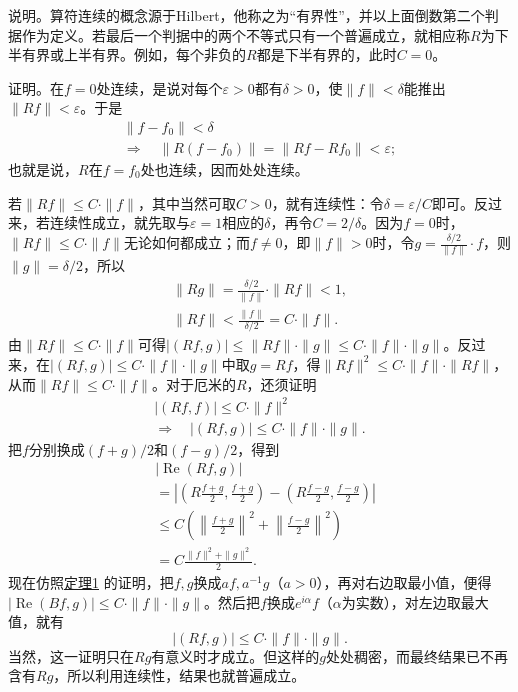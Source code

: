 \documentclass[fontsize=13pt,twoside,openany,headings=normal,parskip=false,bookmarkpackage=false,DIV=calc]{scrbook}
\newcommand{\textkaishu}[1]{{\zhkaishu #1}}
\begin{document}
\hypertarget{origpage-52}{}\label{origpage-52}\textkaishu{说明。}算符连续的概念源于Hilbert，他称之为“有界性”，并以上面倒数第二个判据作为定义。若最后一个判据中的两个不等式只有一个普遍成立，就相应称$R$为下半有界或上半有界。例如，每个非负的$R$都是下半有界的，此时$C=0$。

\textkaishu{证明。}在$f=0$处连续，是说对每个$\varepsilon>0$都有$\delta>0$，使$\|f\|<\delta$能推出$\|Rf\|<\varepsilon$。于是
\begin{gather*}
\|f-f_0\|<\delta\\
\Longrightarrow\quad\|R(f-f_0)\|=\|Rf-Rf_0\|<\varepsilon;
\end{gather*}
也就是说，$R$在$f=f_0$处也连续，因而处处连续。

若$\|Rf\|\leq C\cdot\|f\|$，其中当然可取$C>0$，就有连续性：令$\delta=\varepsilon/C$即可。反过来，若连续性成立，就先取与$\varepsilon=1$相应的$\delta$，再令$C=2/\delta$。因为$f=0$时，$\|Rf\|\leq C\cdot\|f\|$无论如何都成立；而$f\ne0$，即$\|f\|>0$时，令$g=\frac{\delta/2}{\|f\|}\cdot f$，则$\|g\|=\delta/2$，所以
\begin{gather*}
\|Rg\|=\frac{\delta/2}{\|f\|}\cdot\|Rf\|<1,\\
\|Rf\|<\frac{\|f\|}{\delta/2}=C\cdot\|f\|.
\end{gather*}
由$\|Rf\|\leq C\cdot\|f\|$可得$|(Rf,\allowbreak g)|\leq\|Rf\|\cdot\|g\|\leq C\cdot\|f\|\cdot\|g\|$。反过来，在$|(Rf,\allowbreak g)|\leq C\cdot\|f\|\cdot\|g\|$中取$g=Rf$，得$\|Rf\|^2\leq C\cdot\|f\|\cdot\|Rf\|$，从而$\|Rf\|\leq C\cdot\|f\|$。对于厄米的$R$，还须证明
\begin{gather*}
|(Rf,f)|\leq C\cdot\|f\|^2\\
\Longrightarrow\quad |(Rf,g)|\leq C\cdot\|f\|\cdot\|g\|.
\end{gather*}
把$f$分别换成$(f+g)/2$和$(f-g)/2$，得到
\begin{align*}
&|\operatorname{Re}(Rf,g)|\\
&=\left|\left(R\frac{f+g}{2},\frac{f+g}{2}\right)-\left(R\frac{f-g}{2},\frac{f-g}{2}\right)\right|\\
&\leq C\left(\left\|\frac{f+g}{2}\right\|^2+\left\|\frac{f-g}{2}\right\|^2\right)\\
&=C\frac{\|f\|^2+\|g\|^2}{2}.
\end{align*}
现在仿照\CJKglue \hyperref[thm:II.1]{定理1} 的证明，把$f,\allowbreak g$换成$af,\allowbreak a^{-1}g$（$a>0$），再对右边取最小值，便得$|\operatorname{Re}(Bf,\allowbreak g)|\leq C\cdot\|f\|\cdot\|g\|$。然后把$f$换成$e^{i\alpha}f$（$\alpha$为实数），对左边取最大值，就有
\[
|(Rf,g)|\leq C\cdot\|f\|\cdot\|g\|.
\]
当然，这一证明只在$Rg$有意义时才成立。但这样的$g$处处稠密，而最终结果已不再含有$Rg$，所以利用连续性，结果也就普遍成立。
\end{document}
